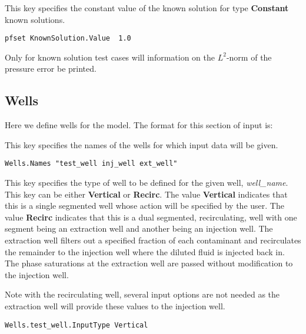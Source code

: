 {This key specifies the constant value of the known solution for type 
{\bf Constant} known solutions.
}
\begin{display}\begin{verbatim}
pfset KnownSolution.Value  1.0
\end{verbatim}\end{display}

Only for known solution test cases will information on the $L^2$-norm
of the pressure error be printed.


\subsection{Wells}
\label{Wells}

Here we define wells for the model.  The format for this section of
input is:

{
This key specifies the names of the wells for which input data will be
given.
}
\begin{display}\begin{verbatim}
Wells.Names "test_well inj_well ext_well"
\end{verbatim}\end{display}

{
This key specifies the type of well to be defined for the given well, 
{\em well\_name}.  This key can be either {\bf Vertical} or
{\bf Recirc}.  The value {\bf Vertical} indicates that this is a
single segmented well whose action will be specified by the user.
The value {\bf Recirc} indicates that this is a dual segmented,
recirculating, well with one segment being an extraction well and
another being an injection well.  The extraction well filters out a
specified fraction of each contaminant and recirculates the remainder
to the injection well where the diluted fluid is injected back in.  The
phase saturations at the extraction well are passed without modification
to the injection well.

Note with the recirculating well, several input options are not needed
as the extraction well will provide these values to the injection well.
}
\begin{display}\begin{verbatim}
Wells.test_well.InputType Vertical
\end{verbatim}\end{display}

